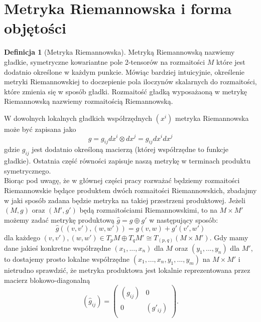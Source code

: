 \documentclass[licencjacka]{pracamgr}
\theoremstyle{definition}
\newtheorem{definition}{Definicja}[section]
\theoremstyle{definition}
\theoremstyle{plain}
\theoremstyle{plain}
\theoremstyle{plain}
\theoremstyle{plain}
\theoremstyle{plain}
\begin{document}
\section{Metryka Riemannowska i forma objętości}

\begin{definition}[Metryka Riemannowska]
Metryką Riemannowską nazwiemy gładkie, symetryczne kowariantne pole 2-tensorów
na rozmaitości $M$ które jest dodatnio określone w każdym punkcie. Mówiąc
bardziej intuicyjnie, określenie metryki Riemannowskiej to doczepienie pola
iloczynów skalarnych do rozmaitości, które zmienia się w sposób gładki.
Rozmaitość gładką wyposażaoną w metrykę Riemannowską nazwiemy rozmaitością
Riemannowską.
\end{definition}

W dowolnych lokalnych gładkich współrzędnych $(x^i)$ metryka Riemannowska
może być zapisana jako
\[ %
    g = g_{ij} dx^i \otimes dx^j = g_{ij} dx^i dx^j
\]
gdzie
$g_{ij}$
jest dodatnio określoną macierzą (której współrzędne to funkcje gładkie). Ostatnia
część równości zapisuje naszą metrykę w terminach produktu symetrycznego. \\

Biorąc pod uwagę, że w głównej części pracy rozważać będziemy
rozmaitości Riemannowskie będące produktem dwóch rozmaitości
Riemannowskich, zbadajmy w jaki sposób zadana będzie metryka na takiej
przestrzeni produktowej. Jeżeli $(M, g)$ oraz $(M', g')$ będą rozmaitościami
Riemannowskimi, to na $M \times M'$ możemy zadać metrykę produktową
 $\hat g = g \oplus g'$ w następujący sposób:
\begin{equation}\label{metric-form}
\hat g
 \left( (v, v'), (w, w') \right) =
 g(v, w) + g'(v', w')
\end{equation}
dla każdego
 $(v, v'), (w, w') \in T_p M \oplus T_q M' \cong T_{(p, q)} (M \times M')$.
Gdy mamy dane jakieś konkretne współrzędne $(x_1, ... , x_n)$ dla $M$ oraz
$(y_1, ..., y_n)$ dla $M'$, to dostajemy prosto lokalne współrzędne $(x_1, ...,
x_n, y_1, ..., y_m)$ na $M \times M'$ i nietrudno sprawdzić, że metryka
produktowa jest lokalnie reprezentowana przez macierz blokowo-diagonalną
\[
  \left(\hat g_{ij} \right)  = 
  \left(
    \begin{array}{cc}
  \left( g_{ij} \right) &  0 \\
      0      & \left( g'_{ij} \right) \\
      \end{array}
  \right).
\] \\
\end{document}
